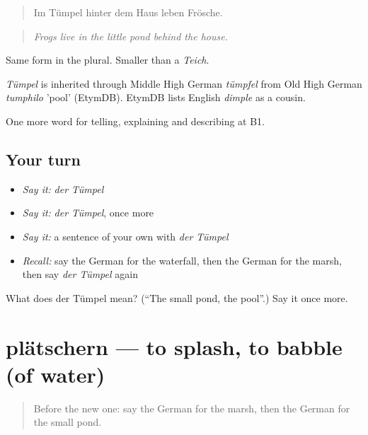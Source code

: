 \begin{quote}
Im Tümpel hinter dem Haus leben Frösche.
\end{quote}

\begin{quote}
\emph{Frogs live in the little pond behind the house.}
\end{quote}

Same form in the plural. Smaller than a \emph{Teich}.

\begin{cousinweb}
\emph{Tümpel} is inherited through Middle High German \emph{tümpfel} from Old High German \emph{tumphilo} 'pool' (EtymDB). EtymDB lists English \emph{dimple} as a cousin.
\end{cousinweb}

\begin{grammarlens}[title={What you've built}]
One more word for telling, explaining and describing at B1.
\end{grammarlens}

\subsection*{Your turn}
\begin{itemize}
\raggedright
  \item \emph{Say it:} \emph{der Tümpel}
  \item \emph{Say it:} \emph{der Tümpel}, once more
  \item \emph{Say it:} a sentence of your own with \emph{der Tümpel}
  \item \emph{Recall:} say the German for the waterfall, then the German for the marsh, then say \emph{der Tümpel} again
\end{itemize}

\begin{tcolorbox}[breakable,colback=teal!4,colframe=teal!35!black,title={Before you move on}]
What does der Tümpel mean? (\textquotedblleft{}The small pond, the pool\textquotedblright{}.) Say it once more.
\end{tcolorbox}
\section[plätschern]{plätschern — to splash, to babble (of water)}

\label{lesson:GE-C455-plaetschern}



\begin{quote}
Before the new one: say the German for the marsh, then the German for the small pond.
\end{quote}

